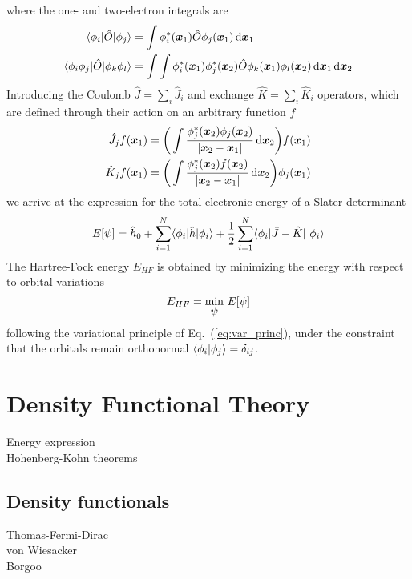 where the one- and two-electron integrals are
\begin{align}
    \langle \phi_i|\hat{O}|\phi_j \rangle &= \int\phi_i^{\ast}(\boldsymbol x_1)
    \hat{O}\phi_j(\boldsymbol x_1) \,\mathrm{d} \boldsymbol x_1\\
    \langle \phi_i\phi_j|\hat{O}|\phi_k\phi_l \rangle &= \int \int 
    \phi_i^{\ast}(\boldsymbol x_1)\phi_j^{\ast}(\boldsymbol x_2)
    \hat{O}\phi_k(\boldsymbol x_1)\phi_l(\boldsymbol x_2) \,\mathrm{d} \boldsymbol x_1 \,\mathrm{d} \boldsymbol x_2
\end{align}
Introducing the Coulomb $\hat{J}=\sum_i\hat{J}_i$ and exchange $\hat{K}=\sum_i\hat{K}_i$
operators, which are defined through their action on an arbitrary function $f$ 
\begin{align}
    \hat{J}_j f(\boldsymbol x_1) &= \bigg(\int \frac{\phi_j^{\ast}(\boldsymbol x_2)\phi_j(\boldsymbol x_2)}
	{|\boldsymbol x_2-\boldsymbol x_1|}\,\mathrm{d}\boldsymbol x_2\bigg) f(\boldsymbol x_1)\\
    \hat{K}_j f(\boldsymbol x_1) &= \bigg(\int \frac{\phi_j^{\ast}(\boldsymbol x_2)f(\boldsymbol x_2)}
	{|\boldsymbol x_2-\boldsymbol x_1|}\,\mathrm{d}\boldsymbol x_2\bigg) \phi_j(\boldsymbol x_1)
\end{align}
we arrive at the expression for the total electronic energy of a Slater determinant
\begin{equation}
    E[\wavefunction] = \hat{h}_0 +
    \sum_{i=1}^N \langle \orbital_i |\hat{h}| \orbital_i \rangle +
    \frac{1}{2} \sum_{i=1}^N 
    \langle \orbital_i |\hat{J}-\hat{K}| \orbital_i\rangle
\end{equation}
The Hartree-Fock energy $E_{HF}$ is obtained by minimizing the energy with respect 
to orbital variations
\begin{equation}
    E_{HF} = \mymin{\wavefunction}\ E[\wavefunction]
\end{equation}
following the variational principle of Eq.~(\ref{eq:var_princ}), under the constraint 
that the orbitals remain orthonormal $\langle\phi_i|\phi_j\rangle = \delta_{ij}$.

\section{Density Functional Theory} \label{sec:DFT}
Energy expression\\
Hohenberg-Kohn theorems\\

\subsection{Density functionals}
Thomas-Fermi-Dirac\\
von Wiesacker\\
Borgoo\\

